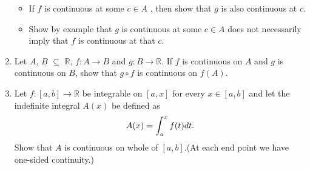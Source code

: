 \documentclass[journal,12pt,onecolumn]{IEEEtran}
\begin{document}
\begin{enumerate}
\setlength\itemsep{2em}
\begin{itemize}
\item If $f$ is continuous at some $c\in A$ , then show that $g$ is also continuous at $c$.
\item Show by example that $g$ is continuous at some $c\in A$ does not necessarily imply that $f$ is continuous at that $c$.
\end{itemize}

\item Let $A$, $B$ $\subseteq$ $\mathbb{R}$, $f:A \rightarrow B$ and $g:B \rightarrow \mathbb{R}$. If $f$ is continuous on $A$ and $g$ is continuous on $B$, show that $g\circ f$  is continuous on $f(A)$.


\item Let $f:[a,b]\rightarrow\mathbb{R}$ be integrable on $[a,x]$ for every $x\in [a,b]$ and let the indefinite integral $A(x)$ be defined as
\begin{equation*}
A(x)=\int_{a}^{x}f(t)dt.\\
\end{equation*}
Show that $A$ is continuous on whole of $[a,b]$.(At each end point we have one-sided continuity.)\\


\end{enumerate}
\end{document}
